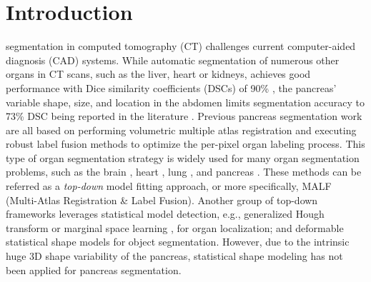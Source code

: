 \documentclass[journal]{IEEEtran}
\begin{document}
\IEEEpeerreviewmaketitle
\section{Introduction}
 segmentation in computed tomography (CT) challenges current computer-aided diagnosis (CAD) systems. While automatic segmentation of numerous other organs in CT scans, such as the liver, heart or kidneys, achieves good performance with Dice similarity coefficients (DSCs) of 90\% \cite{Wang2014Miccai,Chu2013Miccai,wolz2013automated}, the pancreas' variable shape, size, and location in the abdomen limits segmentation accuracy to 73\% DSC being reported in the literature \cite{wolz2013automated,Chu2013Miccai,tong2015discriminative,okada2015abdominal,farag2014bottom,roth2015deeporgan}. Previous pancreas segmentation work \cite{wolz2013automated,Chu2013Miccai,tong2015discriminative,okada2015abdominal} are all based on performing volumetric multiple atlas registration \cite{Modat2010,avants2009advanced,Avants2011reproducible} and executing robust label fusion methods \cite{Wang2013Multi,Bai2013probabilistic,Wang2014Segmentation} to optimize the per-pixel organ labeling process. This type of organ segmentation strategy is widely used for many organ segmentation problems, such as the brain \cite{Wang2013Multi,Wang2014Segmentation}, heart \cite{Bai2013probabilistic}, lung \cite{Murphy2011Evaluation}, and pancreas \cite{wolz2013automated,Chu2013Miccai,tong2015discriminative,okada2015abdominal}. These methods can be referred as a {\em top-down} model fitting approach, or more specifically, MALF (Multi-Atlas Registration \& Label Fusion). Another group of top-down frameworks \cite{Ecabert2008Automatic,Zheng08,Ling08} leverages statistical model detection, e.g., generalized Hough transform \cite{Ecabert2008Automatic} or marginal space learning \cite{Zheng08,Ling08}, for organ localization; and deformable statistical shape models for object segmentation. However, due to the intrinsic huge 3D shape variability of the pancreas, statistical shape modeling has not been applied for pancreas segmentation.
\end{document}
